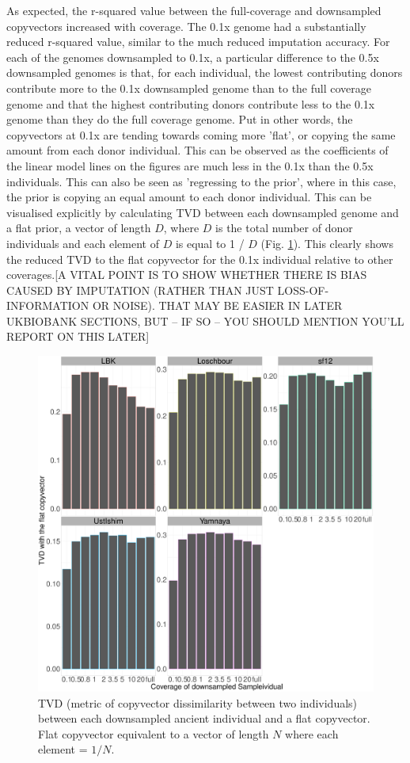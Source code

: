 As expected, the r-squared value between the full-coverage and downsampled copyvectors increased with coverage. The 0.1x genome had a substantially reduced r-squared value, similar to the much reduced imputation accuracy. For each of the genomes downsampled to 0.1x, a particular difference to the 0.5x downsampled genomes is that, for each individual, the lowest contributing donors contribute more to the 0.1x downsampled genome than to the full coverage genome and that the highest contributing donors contribute less to the 0.1x genome than they do the full coverage genome. Put in other words, the copyvectors at 0.1x are tending towards coming more 'flat', or copying the same amount from each donor individual. This can be observed as the coefficients of the linear model lines on the figures are much less in the 0.1x than the 0.5x individuals. This can also be seen as 'regressing to the prior', where in this case, the prior is copying an equal amount to each donor individual. This can be visualised explicitly by calculating TVD between each downsampled genome and a flat prior, a vector of length $D$, where $D$ is the total number of donor individuals and each element of $D$ is equal to 1 / $D$ (Fig. \ref{fig:TVD_ancients_flat_prior}). This clearly shows the reduced TVD to the flat copyvector for the 0.1x individual relative to other coverages.{\color{red}[A VITAL POINT IS TO SHOW WHETHER THERE IS BIAS CAUSED BY IMPUTATION (RATHER THAN JUST LOSS-OF-INFORMATION OR NOISE). THAT MAY BE EASIER IN LATER UKBIOBANK SECTIONS, BUT -- IF SO -- YOU SHOULD MENTION YOU'LL REPORT ON THIS LATER]}

\begin{figure}[htp]
    \centering
    \includegraphics[width=1.0\textwidth]{../images/chapter1/TVD_ancients_flat_prior.pdf}
    \caption{TVD (metric of copyvector dissimilarity between two individuals) between each downsampled ancient individual and a flat copyvector. Flat copyvector equivalent to a vector of length $N$ where each element = $1/N$.}
    \label{fig:TVD_ancients_flat_prior}
\end{figure}

